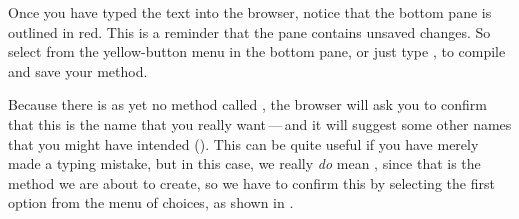 \documentclass[a4paper,10pt,twoside]{book}
\begin{document}
Once you have typed the text into the browser, notice that the bottom pane is outlined in red.  This is a reminder that the pane contains unsaved changes.
So select  from the yellow-button menu in the bottom pane, or just type , to compile and save your method.

Because there is as yet no method called , the browser will ask you to confirm that this is the name that you really want\,---\,and it will suggest some other names that you might have intended ().
This can be quite useful if you have merely made a typing mistake, but in this case, we really \emph{do} mean , since that is the method we are about to create, so we have to confirm this by selecting the first option from the menu of choices, as shown in . 
\end{document}

